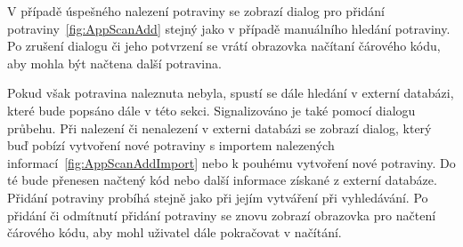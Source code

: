 \documentclass[thesis=B,czech]{FITthesis}[2013/10/20]
\begin{document}
V případě úspešného nalezení potraviny se zobrazí dialog pro přidání potraviny~\ref{fig:AppScanAdd} stejný jako v případě manuálního hledání potraviny. Po zrušení dialogu či jeho potvrzení se vrátí obrazovka načítaní čárového kódu, aby mohla být načtena další potravina.

Pokud však potravina naleznuta nebyla, spustí se dále hledání v externí databázi, které bude popsáno dále v této sekci. Signalizováno je také pomocí dialogu průbehu. Při nalezení či nenalezení v externi databázi se zobrazí dialog, který buď pobízí vytvoření nové potraviny s importem nalezených informací~\ref{fig:AppScanAddImport} nebo k pouhému vytvoření nové potraviny. Do té bude přenesen načtený kód nebo další informace získané z externí databáze. Přidání potraviny probíhá stejně jako při jejím vytváření při vyhledávání. Po přidání či odmítnutí přidání potraviny se znovu zobrazí obrazovka pro načtení čárového kódu, aby mohl uživatel dále pokračovat v načítání.
\end{document}
